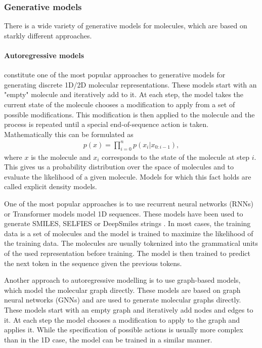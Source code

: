 \subsubsection{Generative models}
There is a wide variety of generative models for molecules, which are based 
on starkly different approaches. 

\paragraph{Autoregressive models} constitute one of the most popular approaches
to generative models for generating discrete 1D/2D molecular representations. 
These models start with an "empty" molecule and iteratively add to it. 
At each step, the model takes the current state of the molecule chooses 
a modification to apply from a set of possible modifications. This modification
is then applied to the molecule and the process is repeated until a special
end-of-sequence action is taken. Mathematically this can be formulated as
\begin{align}
    p(x) = \prod_{i=0}^n p(x_i | x_{0:i-1}), 
\end{align}
where $x$ is the molecule and $x_i$ corresponds to the state of the molecule 
at step $i$. This gives us a probability distribution over the space of molecules
and to evaluate the likelihood of a given molecule. Models for which this fact 
holds are called explicit density models.

One of the most popular approaches is to use recurrent neural networks (RNNs)
or Transformer models \citep{vaswaniAttentionAllYou2017} model 1D sequences.
These models have been used to generate SMILES, SELFIES or DeepSmiles strings
\citep{seglerGeneratingFocusedMolecule2018,todo}. 
In most cases, the training data is a set of molecules and the model is trained
to maximize the likelihood of the training data. The molecules are usually
tokenized into the grammatical units of the used representation before training. 
The model is then trained to predict the next token in the sequence given the
previous tokens.

Another approach to autoregressive modelling is to use graph-based models, which
model the molecular graph directly. These models are based on graph neural
networks (GNNs) and are used to generate molecular graphs directly. 
These models start with an empty graph and iteratively add nodes and edges to
it. At each step the model chooses a modification to apply to the graph and
applies it. While the specification of possible actions is usually more 
complex than in the 1D case, the model can be trained in a similar manner.

